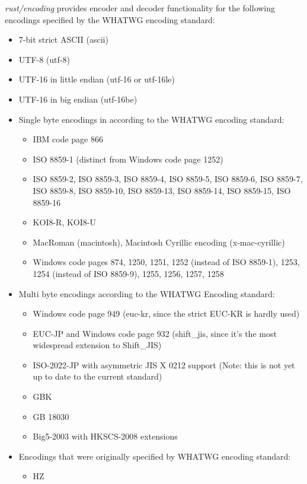 \emph{rust/encoding} provides encoder and decoder functionality for the
following encodings specified by the WHATWG encoding standard:

\begin{itemize}
\item
  7-bit strict ASCII (ascii)
\item
  UTF-8 (utf-8)
\item
  UTF-16 in little endian (utf-16 or utf-16le)
\item
  UTF-16 in big endian (utf-16be)
\item
  Single byte encodings in according to the WHATWG encoding standard:

  \begin{itemize}
  \item
    IBM code page 866
  \item
    ISO 8859-1 (distinct from Windows code page 1252)
  \item
    ISO 8859-2, ISO 8859-3, ISO 8859-4, ISO 8859-5, ISO 8859-6, ISO
    8859-7, ISO 8859-8, ISO 8859-10, ISO 8859-13, ISO 8859-14, ISO
    8859-15, ISO 8859-16
  \item
    KOI8-R, KOI8-U
  \item
    MacRoman (macintosh), Macintosh Cyrillic encoding (x-mac-cyrillic)
  \item
    Windows code pages 874, 1250, 1251, 1252 (instead of ISO 8859-1),
    1253, 1254 (instead of ISO 8859-9), 1255, 1256, 1257, 1258
  \end{itemize}
\item
  Multi byte encodings according to the WHATWG Encoding standard:

  \begin{itemize}
  \item
    Windows code page 949 (euc-kr, since the strict EUC-KR is hardly
    used)
  \item
    EUC-JP and Windows code page 932 (shift\_jis, since it's the most
    widespread extension to Shift\_JIS)
  \item
    ISO-2022-JP with asymmetric JIS X 0212 support (Note: this is not
    yet up to date to the current standard)
  \item
    GBK
  \item
    GB 18030
  \item
    Big5-2003 with HKSCS-2008 extensions
  \end{itemize}
\item
  Encodings that were originally specified by WHATWG encoding standard:

  \begin{itemize}
  \item
    HZ
  \end{itemize}
\end{itemize}

